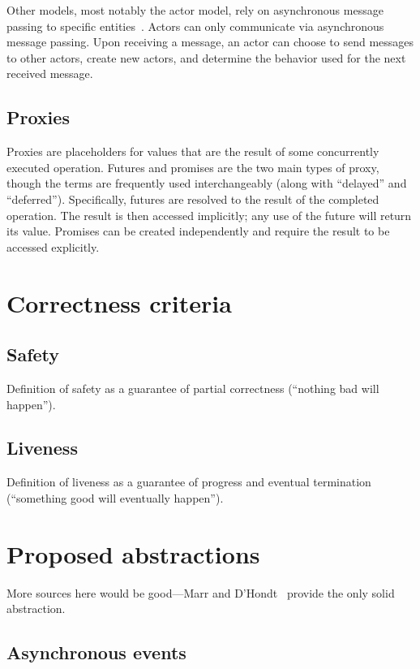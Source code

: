 \documentclass{sig-alternate}
\begin{document}
Other models, most notably the actor model, rely on asynchronous message passing to specific entities~\cite{Agha1986}. Actors can only communicate via asynchronous message passing. Upon receiving a message, an actor can choose to send messages to other actors, create new actors, and determine the behavior used for the next received message.

\subsection{Proxies}

Proxies are placeholders for values that are the result of some concurrently executed operation. Futures and promises are the two main types of proxy, though the terms are frequently used interchangeably (along with ``delayed'' and ``deferred''). Specifically, futures are resolved to the result of the completed operation. The result is then accessed implicitly; any use of the future will return its value. Promises can be created independently and require the result to be accessed explicitly.

\section{Correctness criteria}

\subsection{Safety}

Definition of safety as a guarantee of partial correctness (``nothing bad will happen'').

\subsection{Liveness}

Definition of liveness as a guarantee of progress and eventual termination (``something good will eventually happen'').

\section{Proposed abstractions}

More sources here would be good---Marr and D'Hondt~\cite{Marr2012} provide the only solid abstraction.

\subsection{Asynchronous events}
\end{document}
